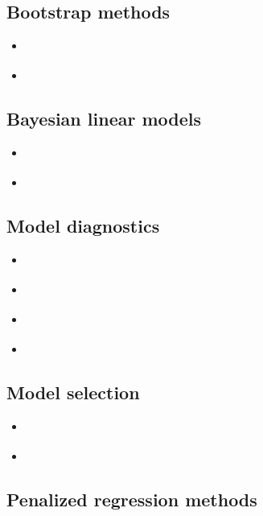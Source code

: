 \documentclass{report}
\begin{document}
\subsection{Bootstrap methods}

\begin{itemize}
    \item \cite[Chapter~3.6]{faraway_linear_2015}
    \item \cite[Chapter~2.7]{wakefield_bayesian_2013}
\end{itemize}

\subsection{Bayesian linear models}

\begin{itemize}
    \item \cite[Chapter~3]{wakefield_bayesian_2013}
    \item \cite[Chapter~10.2]{agresti_foundations_2015}
\end{itemize}

\subsection{Model diagnostics}

\begin{itemize}
    \item \cite[Chapter~6]{faraway_linear_2015}
    \item \cite[Chapter~5.11]{wakefield_bayesian_2013}
    \item \cite[Chapter~2.5]{agresti_foundations_2015}
    \item \cite[Chapter~3]{dunn_generalized_2018}
\end{itemize}

\subsection{Model selection}

\begin{itemize}
    \item \cite[Chapter~10]{faraway_linear_2015}
    \item \cite[Chapter~4.8]{wakefield_bayesian_2013}
\end{itemize}

\subsection{Penalized regression methods}
\end{document}
